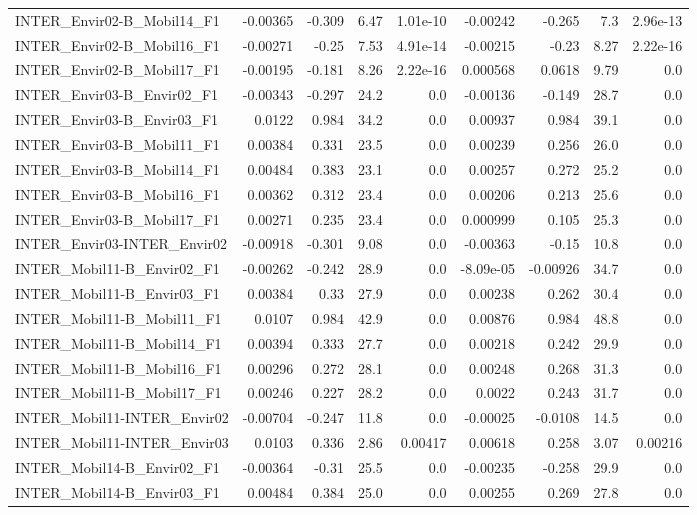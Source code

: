 \begin{tabular}{lrrrrrrrr}
INTER_Envir02-B_Mobil14_F1 & -0.00365 & -0.309 & 6.47 & 1.01e-10 & -0.00242 & -0.265 & 7.3 & 2.96e-13 \\
INTER_Envir02-B_Mobil16_F1 & -0.00271 & -0.25 & 7.53 & 4.91e-14 & -0.00215 & -0.23 & 8.27 & 2.22e-16 \\
INTER_Envir02-B_Mobil17_F1 & -0.00195 & -0.181 & 8.26 & 2.22e-16 & 0.000568 & 0.0618 & 9.79 & 0.0 \\
INTER_Envir03-B_Envir02_F1 & -0.00343 & -0.297 & 24.2 & 0.0 & -0.00136 & -0.149 & 28.7 & 0.0 \\
INTER_Envir03-B_Envir03_F1 & 0.0122 & 0.984 & 34.2 & 0.0 & 0.00937 & 0.984 & 39.1 & 0.0 \\
INTER_Envir03-B_Mobil11_F1 & 0.00384 & 0.331 & 23.5 & 0.0 & 0.00239 & 0.256 & 26.0 & 0.0 \\
INTER_Envir03-B_Mobil14_F1 & 0.00484 & 0.383 & 23.1 & 0.0 & 0.00257 & 0.272 & 25.2 & 0.0 \\
INTER_Envir03-B_Mobil16_F1 & 0.00362 & 0.312 & 23.4 & 0.0 & 0.00206 & 0.213 & 25.6 & 0.0 \\
INTER_Envir03-B_Mobil17_F1 & 0.00271 & 0.235 & 23.4 & 0.0 & 0.000999 & 0.105 & 25.3 & 0.0 \\
INTER_Envir03-INTER_Envir02 & -0.00918 & -0.301 & 9.08 & 0.0 & -0.00363 & -0.15 & 10.8 & 0.0 \\
INTER_Mobil11-B_Envir02_F1 & -0.00262 & -0.242 & 28.9 & 0.0 & -8.09e-05 & -0.00926 & 34.7 & 0.0 \\
INTER_Mobil11-B_Envir03_F1 & 0.00384 & 0.33 & 27.9 & 0.0 & 0.00238 & 0.262 & 30.4 & 0.0 \\
INTER_Mobil11-B_Mobil11_F1 & 0.0107 & 0.984 & 42.9 & 0.0 & 0.00876 & 0.984 & 48.8 & 0.0 \\
INTER_Mobil11-B_Mobil14_F1 & 0.00394 & 0.333 & 27.7 & 0.0 & 0.00218 & 0.242 & 29.9 & 0.0 \\
INTER_Mobil11-B_Mobil16_F1 & 0.00296 & 0.272 & 28.1 & 0.0 & 0.00248 & 0.268 & 31.3 & 0.0 \\
INTER_Mobil11-B_Mobil17_F1 & 0.00246 & 0.227 & 28.2 & 0.0 & 0.0022 & 0.243 & 31.7 & 0.0 \\
INTER_Mobil11-INTER_Envir02 & -0.00704 & -0.247 & 11.8 & 0.0 & -0.00025 & -0.0108 & 14.5 & 0.0 \\
INTER_Mobil11-INTER_Envir03 & 0.0103 & 0.336 & 2.86 & 0.00417 & 0.00618 & 0.258 & 3.07 & 0.00216 \\
INTER_Mobil14-B_Envir02_F1 & -0.00364 & -0.31 & 25.5 & 0.0 & -0.00235 & -0.258 & 29.9 & 0.0 \\
INTER_Mobil14-B_Envir03_F1 & 0.00484 & 0.384 & 25.0 & 0.0 & 0.00255 & 0.269 & 27.8 & 0.0 \\

\end{tabular}
